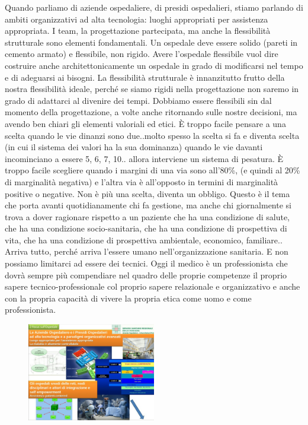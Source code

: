 Quando parliamo di aziende ospedaliere, di presidi ospedalieri, stiamo
parlando di ambiti organizzativi ad alta tecnologia: luoghi appropriati
per assistenza appropriata. I team, la progettazione partecipata, ma
anche la flessibilità strutturale sono elementi fondamentali. Un
ospedale deve essere solido (pareti in cemento armato) e flessibile, non
rigido. Avere l'ospedale flessibile vuol dire costruire anche
architettonicamente un ospedale in grado di modificarsi nel tempo e di
adeguarsi ai bisogni. La flessibilità strutturale è innanzitutto frutto
della nostra flessibilità ideale, perché se siamo rigidi nella
progettazione non saremo in grado di adattarci al divenire dei tempi.
Dobbiamo essere flessibili sin dal momento della progettazione, a volte
anche ritornando sulle nostre decisioni, ma avendo ben chiari gli
elementi valoriali ed etici. È troppo facile pensare a una scelta quando
le vie dinanzi sono due..molto spesso la scelta si fa e diventa scelta
(in cui il sistema dei valori ha la sua dominanza) quando le vie davanti
incominciano a essere 5, 6, 7, 10.. allora interviene un sistema di
pesatura. È troppo facile scegliere quando i margini di una via sono
all'80\%, (e quindi al 20\% di marginalità negativa) e l'altra via è
all'opposto in termini di marginalità positive o negative. Non è più una
scelta, diventa un obbligo. Questo è il tema che porta avanti
quotidianamente chi fa gestione, ma anche chi giornalmente si trova a
dover ragionare rispetto a un paziente che ha una condizione di salute,
che ha una condizione socio-sanitaria, che ha una condizione di
prospettiva di vita, che ha una condizione di prospettiva ambientale,
economico, familiare.. Arriva tutto, perché arriva l'essere umano
nell'organizzazione sanitaria. E non possiamo limitarci ad essere dei
tecnici. Oggi il medico è un professionista che dovrà sempre più
compendiare nel quadro delle proprie competenze il proprio sapere
tecnico-professionale col proprio sapere relazionale e organizzativo e
anche con la propria capacità di vivere la propria etica come uomo e
come professionista.

 \begin{figure}[!ht]
\centering
	\includegraphics[width=0.5\textwidth]{32/image10.jpeg}
	\end{figure}

